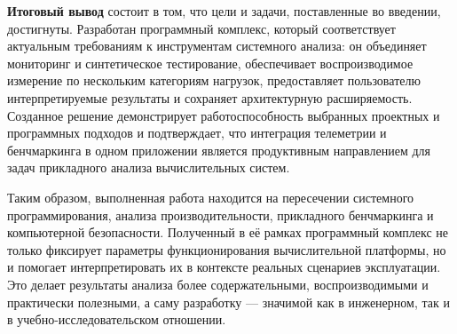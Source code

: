 \textbf{Итоговый вывод} состоит в том, что цели и задачи, поставленные во введении, достигнуты. Разработан программный комплекс, который соответствует актуальным требованиям к инструментам системного анализа: он объединяет мониторинг и синтетическое тестирование, обеспечивает воспроизводимое измерение по нескольким категориям нагрузок, предоставляет пользователю интерпретируемые результаты и сохраняет архитектурную расширяемость. Созданное решение демонстрирует работоспособность выбранных проектных и программных подходов и подтверждает, что интеграция телеметрии и бенчмаркинга в одном приложении является продуктивным направлением для задач прикладного анализа вычислительных систем.

Таким образом, выполненная работа находится на пересечении системного программирования, анализа производительности, прикладного бенчмаркинга и компьютерной безопасности. Полученный в её рамках программный комплекс не только фиксирует параметры функционирования вычислительной платформы, но и помогает интерпретировать их в контексте реальных сценариев эксплуатации. Это делает результаты анализа более содержательными, воспроизводимыми и практически полезными, а саму разработку --- значимой как в инженерном, так и в учебно-исследовательском отношении.
